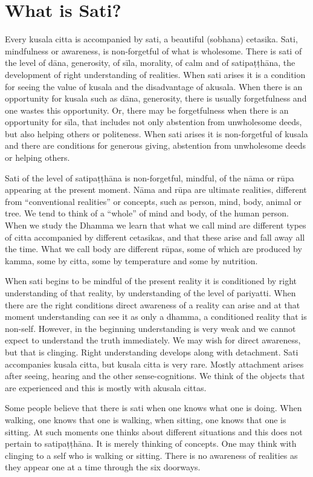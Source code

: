 {{{{\chapter{What is Sati?}

Every kusala citta is accompanied by
sati, a beautiful (sobhana) cetasika. Sati, mindfulness or awareness, is
non-forgetful of what is wholesome. There is sati of the level of dāna,
generosity, of sīla, morality, of calm and of satipaṭṭhāna, the
development of right understanding of realities. When sati arises it is
a condition for seeing the value of kusala and the disadvantage of
akusala. When there is an opportunity for kusala such as dāna,
generosity, there is usually forgetfulness and one wastes this
opportunity. Or, there may be forgetfulness when there is an opportunity
for sīla, that includes not only abstention from unwholesome deeds, but
also helping others or politeness. When sati arises it is non-forgetful
of kusala and there are conditions for generous giving, abstention from
unwholesome deeds or helping others. 

Sati of the level of
satipaṭṭhāna is non-forgetful,
mindful, of the nāma or rūpa
appearing at the present moment.
Nāma and rūpa are ultimate realities,
different from ``conventional realities'' or concepts, such as person,
mind, body, animal or tree. We tend to think of a ``whole'' of mind and
body, of the human person. When we study the Dhamma we learn that what
we call mind are different types of citta accompanied by different
cetasikas, and that these arise and fall away all the time. What we call
body are different rūpas, some of which are produced by kamma, some by
citta, some by temperature and some by nutrition.

When sati begins to be mindful of the
present reality it is conditioned by right understanding of that
reality, by understanding of the level of pariyatti. When there are the
right conditions direct awareness of a reality can arise and at that
moment understanding can see it as only a dhamma, a conditioned reality
that is non-self. However, in the beginning understanding is very weak
and we cannot expect to understand the truth immediately. We may wish
for direct awareness, but that is clinging. Right understanding develops
along with detachment. Sati accompanies kusala citta, but kusala citta
is very rare. Mostly attachment arises after seeing, hearing and the
other sense-cognitions. We think of the objects that are experienced and
this is mostly with akusala cittas.

Some people believe that there is sati
when one knows what one is doing. When walking, one knows that one is
walking, when sitting, one knows that one is sitting. At such moments
one thinks about different situations and this does not pertain to
satipaṭṭhāna. It is merely thinking of concepts. One may think with
clinging to a self who is walking or sitting. There is no awareness of
realities as they appear one at a time through the six doorways. 

}}}}
